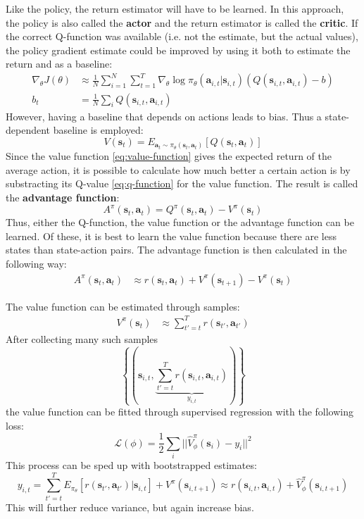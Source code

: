 Like the policy, the return estimator will have to be learned.
In this approach, the policy is also called the \textbf{actor} 
and the return estimator is called the \textbf{critic}.
If the correct Q-function was available (i.e. not the estimate, but the actual values),
the policy gradient estimate could be improved by using it
both to estimate the return and as a baseline:
\begin{align}
		\nabla_\theta J(\theta) &\approx \frac{1}{N} \sum_{i=1}^{N} \sum_{t=1}^{T} \nabla_\theta \log \pi_\theta (\bm{a}_{i,t}| \bm{s}_{i,t})
( Q(\bm{s}_{i,t}, \bm{a}_{i,t}) - b) \\
		b_t &= \frac{1}{N} \sum_{i}^{} Q(\bm{s}_{i,t}, \bm{a}_{i,t})
\end{align}
However, having a baseline that depends on actions leads to bias.
Thus a state-dependent baseline is employed: 
\begin{equation}
		V(\bm{s}_t) = E_{\bm{a}_t \sim \pi_\theta (\bm{s}_{t}, \bm{a}_{t})} [Q(\bm{s}_{t}, \bm{a}_{t})]
\end{equation}
Since the value function \ref{eq:value-function} gives the expected return of the average action,
it is possible to calculate how much better a certain action is by substracting
its Q-value \ref{eq:q-function} for the value function.
The result is called the \textbf{advantage function}:
\begin{equation}
A^\pi (\bm{s}_{t}, \bm{a}_{t}) = Q^\pi (\bm{s}_{t}, \bm{a}_{t}) - V^\pi (\bm{s}_t)
\end{equation}
Thus, either the Q-function, the value function or the advantage function can be learned.
Of these, it is best to learn the value function because there are less 
states than state-action pairs.
The advantage function is then calculated in the following way:
\begin{align}
		A^\pi (\bm{s}_{t}, \bm{a}_{t})  &\approx r(\bm{s}_{t}, \bm{a}_{t}) + V^\pi (\bm{s}_{t+1})  - V^\pi(\bm{s}_t)
\end{align}

The value function can be estimated through samples:
\begin{align}
		V^\pi (\bm{s}_t) &\approx \sum_{t'=t}^{T} r(\bm{s}_{t'}, \bm{a}_{t'})
\end{align}
After collecting many such samples
\begin{equation}
		\left\{ \left( \bm{s}_{i,t}, \underbrace{\sum_{t'=t}^{T} r(\bm{s}_{i,t}, \bm{a}_{i,t})}_{y_{i,t}} \right)  \right\} 
\end{equation}
the value function can be fitted through supervised regression with the following loss:
\begin{equation}
		\mathcal{L}(\phi) = \frac{1}{2} \sum_{i}^{} ||\hat{V}^\pi_\phi (\bm{s}_i) - y_i||^2
\end{equation}
This process can be sped up with bootstrapped estimates:
\begin{equation}
		y_{i,t} = \sum_{t'=t}^{T} E_{\pi_\theta} \left[ r(\bm{s}_{t'}, \bm{a}_{t'})|\bm{s}_{i,t}\right] + V^\pi(\bm{s}_{i,t+1})  
		\approx r(\bm{s}_{i,t}, \bm{a}_{i,t}) + \hat{V}^\pi_\phi(\bm{s}_{i,t+1}) 
\end{equation}
This will further reduce variance, but again increase bias.

